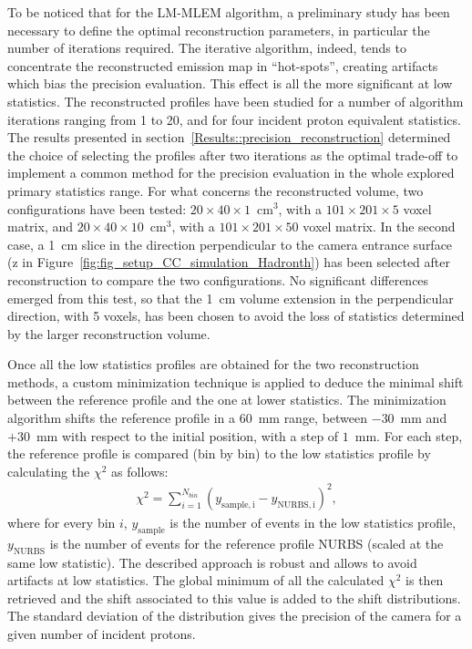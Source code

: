 To be noticed that for the LM-MLEM algorithm, a preliminary study has been necessary to define the optimal reconstruction parameters, in particular the number of iterations required. The iterative algorithm, indeed, tends to concentrate the reconstructed emission map in \enquote{hot-spots}, creating artifacts which bias the precision evaluation. This effect is all the more significant at low statistics. The reconstructed profiles have been studied for a number of algorithm iterations ranging from 1 to 20, and for four incident proton equivalent statistics. The results presented in section~\ref{Results::precision_reconstruction} determined the choice of selecting the profiles after two iterations as the optimal trade-off to implement a common method for the precision evaluation in the whole explored primary statistics range. For what concerns the reconstructed volume, two configurations have been tested: $20\times40\times1$~cm$^3$, with a $101\times201\times5$ voxel matrix, and $20\times40\times10$~cm$^3$, with a $101\times201\times50$ voxel matrix. In the second case, a 1~cm slice in the direction perpendicular to the camera entrance surface (z in Figure~\ref{fig:fig_setup_CC_simulation_Hadronth}) has been selected after reconstruction to compare the two configurations. No significant differences emerged from this test, so that the 1~cm volume extension in the perpendicular direction, with 5 voxels, has been chosen to avoid the loss of statistics determined by the larger reconstruction volume.

Once all the low statistics profiles are obtained for the two reconstruction methods, a custom minimization technique is applied to deduce the minimal shift between the reference profile and the one at lower statistics. The minimization algorithm shifts the reference profile in a 60~mm range, between $-30$~mm and $+30$~mm with respect to the initial position, with a step of $1$~mm. For each step, the reference profile is compared (bin by bin) to the low statistics profile by calculating the $\chi^2$ as follows:
\begin{eqnarray}
\chi^2 = \sum\limits_{i=1}^{N_{bin}} {(y_{\mathrm{sample,i}}-y_{\mathrm{NURBS,i}})^2},
\end{eqnarray}
where for every bin $i$, $y_{\mathrm{sample}}$ is the number of events in the low statistics profile, $y_{\mathrm{NURBS}}$ is the number of events for the reference profile NURBS (scaled at the same low statistic). 
The described approach is robust and allows to avoid artifacts at low statistics.
The global minimum of all the calculated $\chi^2$ is then retrieved and the shift associated to this value is added to the shift distributions. 
The standard deviation of the distribution gives the precision of the camera for a given number of incident protons. 
